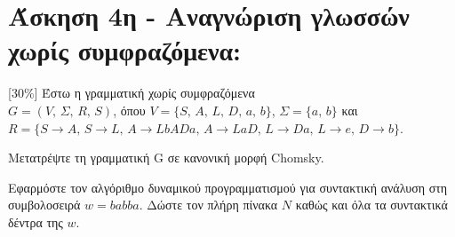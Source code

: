 \section{Άσκηση 4η - Αναγνώριση γλωσσών χωρίς συμφραζόμενα:}
\label{sec:Exercise_4}
\doublespacing

[30\%]  Έστω η γραμματική χωρίς συμφραζόμενα\\ $G = (V,\, \Sigma,\, R,\, S)$,
 όπου $V=\{S,\,A,\,L,\,D,\,a,\,b\}$, $\Sigma=\{a,\,b\}$ και \\
$R=\{S\rightarrow A,\,S\rightarrow L,\,A\rightarrow LbADa,\,A\rightarrow LaD,\,L\rightarrow Da,\,L\rightarrow
e,\,D\rightarrow b\}$.

\bm{\textcolor{blue}{(α)}} Μετατρέψτε τη γραμματική G σε κανονική μορφή Chomsky.

\bm{\textcolor{blue}{(β)}} Εφαρμόστε τον αλγόριθμο δυναμικού προγραμματισμού για συντακτική ανάλυση στη
συμβολοσειρά $w=babba$. Δώστε τον πλήρη πίνακα $N$ καθώς και όλα τα συντακτικά δέντρα της $w$.
\clearpage